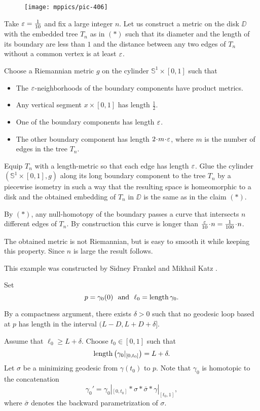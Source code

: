 \begin{figure}[h!]
\vskip0mm
\centering
\texttt{[image: mppics/pic-406]}
\end{figure}

Take $\varepsilon=\tfrac1{10}$ and fix a large integer $n$.
Let us construct a metric on the disk $\DD$ with the embedded tree $T_n$ as in $({*})$ such that
its diameter and the length of its boundary are less than $1$
and  
the distance between any two edges of $T_n$ without a common vertex 
is at least $\varepsilon$.

Choose a Riemannian metric $g$ on the cylinder $\mathbb S^1\times [0,1]$ such that
\begin{itemize}
\item The $\varepsilon$-neighborhoods of the boundary components 
have product metrics.
\item Any vertical segment $x\times[0,1]$ has length $\tfrac 12$.
\item One of the boundary components has length $\varepsilon$.
\item The other boundary component has length $2\cdot m\cdot \eps$, 
where $m$ is the number of edges in the tree $T_n$.
\end{itemize}
Equip $T_n$ with a length-metric so that each edge has length $\varepsilon$.
Glue the cylinder $(\mathbb S^1\times [0,1],g)$ along its long boundary component to the tree $T_n$ by a piecewise isometry 
in such a way that the resulting space is homeomorphic to a disk and the obtained embedding of $T_n$ in $\DD$ is the same as in the claim $({*})$.

By $({*})$, any null-homotopy of the boundary passes a curve that intersects $n$ different edges of $T_n$.
By construction this curve is longer than $\tfrac{\eps}{10}\cdot n=\tfrac{1}{100}\cdot n$.

The obtained metric is not Riemannian, but is easy to smooth it while keeping this property.
Since $n$ is large the result follows.
\qeds
 
This example was constructed by Sidney Frankel and Mikhail Katz \cite{frankel-katz}.
 

Set 
\[p=\gamma_0(0)\ \ \text{and}\ \  \ell_0=\length\gamma_0.\]

By a compactness argument,
there exists $\delta>0$ 
such that no geodesic loop based at $p$ has length in the interval $(L-D, L+D+\delta]$. 

Assume that $\ell_0\ge L+\delta$.
Choose $t_0\in [0,1]$ such that
\[\operatorname{\rm length}\left(\gamma_0|_{[0,t_0]}\right)=L+\delta.\]
Let $\sigma$ be a minimizing geodesic from $\gamma(t_0)$
to $p$.
Note that $\gamma_0$ is homotopic to the concatenation 
\[\gamma_0'=\gamma_0|_{[0,t_0]}*\sigma*\bar\sigma*\gamma|_{[t_0,1]},\]
where $\bar\sigma$ denotes the backward parametrization of $\sigma$.

